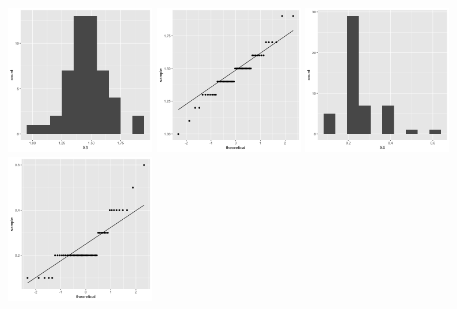 \begin{center}
	\includegraphics[width=1.5in]{II_1_X3_hist.png}
	\includegraphics[width=1.5in]{II_1_X3_qq.png}
	\includegraphics[width=1.5in]{II_1_X4_hist.png}
	\includegraphics[width=1.5in]{II_1_X4_qq.png}
\end{center}
